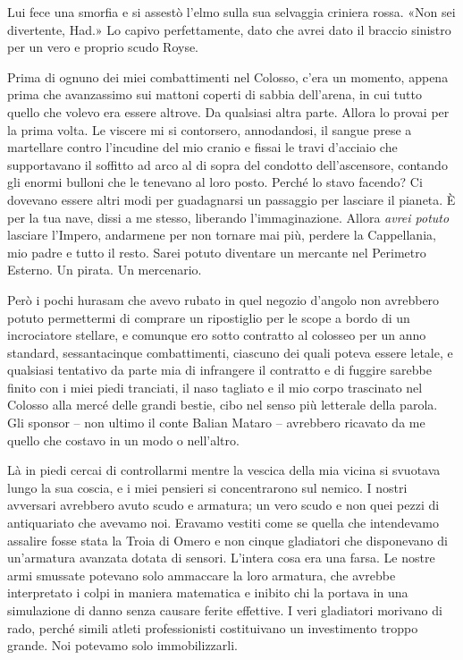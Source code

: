 Lui fece una smorfia e si assestò l'elmo sulla sua selvaggia criniera
rossa. «Non sei divertente, Had.» Lo capivo perfettamente, dato che
avrei dato il braccio sinistro per un vero e proprio scudo Royse.

Prima di ognuno dei miei combattimenti nel Colosso, c'era un momento,
appena prima che avanzassimo sui mattoni coperti di sabbia dell'arena,
in cui tutto quello che volevo era essere altrove. Da qualsiasi altra
parte. Allora lo provai per la prima volta. Le viscere mi si contorsero,
annodandosi, il sangue prese a martellare contro l'incudine del mio
cranio e fissai le travi d'acciaio che supportavano il soffitto ad arco
al di sopra del condotto dell'ascensore, contando gli enormi bulloni che
le tenevano al loro posto. Perché lo stavo facendo? Ci dovevano essere
altri modi per guadagnarsi un passaggio per lasciare il pianeta. È per
la tua nave, dissi a me stesso, liberando l'immaginazione. Allora
\emph{avrei potuto} lasciare l'Impero, andarmene per non tornare mai
più, perdere la Cappellania, mio padre e tutto il resto. Sarei potuto
diventare un mercante nel Perimetro Esterno. Un pirata. Un mercenario.

Però i pochi hurasam che avevo rubato in quel negozio d'angolo non
avrebbero potuto permettermi di comprare un ripostiglio per le scope a
bordo di un incrociatore stellare, e comunque ero sotto contratto al
colosseo per un anno standard, sessantacinque combattimenti, ciascuno
dei quali poteva essere letale, e qualsiasi tentativo da parte mia di
infrangere il contratto e di fuggire sarebbe finito con i miei piedi
tranciati, il naso tagliato e il mio corpo trascinato nel Colosso alla
mercé delle grandi bestie, cibo nel senso più letterale della parola.
Gli sponsor -- non ultimo il conte Balian Mataro -- avrebbero ricavato
da me quello che costavo in un modo o nell'altro.

Là in piedi cercai di controllarmi mentre la vescica della mia vicina si
svuotava lungo la sua coscia, e i miei pensieri si concentrarono sul
nemico. I nostri avversari avrebbero avuto scudo e armatura; un vero
scudo e non quei pezzi di antiquariato che avevamo noi. Eravamo vestiti
come se quella che intendevamo assalire fosse stata la Troia di Omero e
non cinque gladiatori che disponevano di un'armatura avanzata dotata di
sensori. L'intera cosa era una farsa. Le nostre armi smussate potevano
solo ammaccare la loro armatura, che avrebbe interpretato i colpi in
maniera matematica e inibito chi la portava in una simulazione di danno
senza causare ferite effettive. I veri gladiatori morivano di rado,
perché simili atleti professionisti costituivano un investimento troppo
grande. Noi potevamo solo immobilizzarli.

